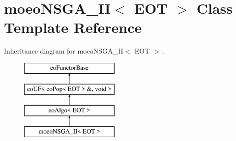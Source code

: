 \section{moeo\-NSGA\_\-II$<$ EOT $>$ Class Template Reference}
\label{classmoeoNSGA__II}
Inheritance diagram for moeo\-NSGA\_\-II$<$ EOT $>$::\begin{figure}[H]
\begin{center}
\leavevmode
\includegraphics[height=4cm]{classmoeoNSGA__II}
\end{center}
\end{figure}
